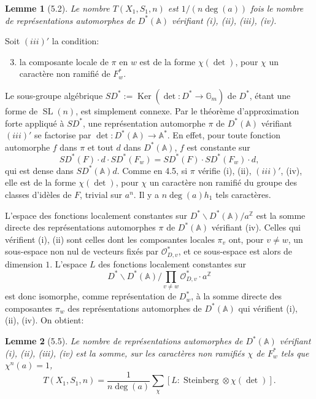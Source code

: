 \documentclass[10pt]{article}
\newcommand{\Z}{\mathbb Z}
\newcommand{\Adele}{\mathbb A}
\newcommand{\Gm}{\mathbb G_m}
\newcommand{\SL}{\operatorname{SL}}
\newcommand{\degm}{\operatorname{deg}}
\theoremstyle{deligne}
\newtheorem*{lemma*}{Lemme}
\newcommand{\Stein}{\operatorname{Steinberg}}
\newcommand{\Ker}{\operatorname{Ker}}
\newcommand{\heading}[1]{\vspace{0.7em}\noindent{\bfseries #1}\quad}
\begin{document}
\begin{lemma*}[5.2]
Le nombre $T(X_1,S_1,n)$ est $1/(n\degm(a))$ fois le nombre de représentations automorphes de $D^*(\Adele)$ vérifiant (i), (ii), (iii), (iv).
\end{lemma*}

\heading{5.3.} Soit $(iii)'$ la condition:
\begin{enumerate}[label=(\roman*)$'$]
\setcounter{enumi}{2}
\item la composante locale de $\pi$ en $w$ est de la forme $\chi(\det)$, pour $\chi$ un caractère non ramifié de $F_w^*$.
\end{enumerate}
Le sous-groupe algébrique $SD^*:=\Ker(\det:D^*\to\Gm)$ de $D^*$, étant une forme de $\SL(n)$, est simplement connexe. Par le théorème d'approximation forte appliqué à $SD^*$, une représentation automorphe $\pi$ de $D^*(\Adele)$ vérifiant $(iii)'$ se factorise par $\det:D^*(\Adele)\to\Adele^*$. En effet, pour toute fonction automorphe $f$ dans $\pi$ et tout $d$ dans $D^*(\Adele)$, $f$ est constante sur
\[
SD^*(F)\cdot d\cdot SD^*(F_w)=SD^*(F)\cdot SD^*(F_w)\cdot d,
\]
qui est dense dans $SD^*(\Adele)d$. Comme en 4.5, si $\pi$ vérifie (i), (ii), $(iii)'$, (iv), elle est de la forme $\chi(\det)$, pour $\chi$ un caractère non ramifié du groupe des classes d'id\`eles de $F$, trivial sur $a^n$. Il y a $n\degm(a)h_1$ tels caractères.

\heading{5.4.} L'espace des fonctions localement constantes sur $D^*\backslash D^*(\Adele)/a^\Z$ est la somme directe des représentations automorphes $\pi$ de $D^*(\Adele)$ vérifiant (iv). Celles qui vérifient (i), (ii) sont celles dont les composantes locales $\pi_v$ ont, pour $v\ne w$, un sous-espace non nul de vecteurs fixés par $\mathcal O_{D,v}^*$, et ce sous-espace est alors de dimension $1$. L'espace $L$ des fonctions localement constantes sur
\[
D^*\backslash D^*(\Adele)/\prod_{v\ne w}\mathcal O_{D,v}^*\cdot a^\Z
\]
est donc isomorphe, comme représentation de $D_w^*$, à la somme directe des composantes $\pi_w$ des représentations automorphes de $D^*(\Adele)$ qui vérifient (i), (ii), (iv). On obtient:

\begin{lemma*}[5.5]
Le nombre de représentations automorphes de $D^*(\Adele)$ vérifiant (i), (ii), (iii), (iv) est la somme, sur les caractères non ramifiés $\chi$ de $F_w^*$ tels que $\chi^n(a)=1$,
\begin{equation}\tag{5.5.1}
T(X_1,S_1,n)=\frac{1}{n\degm(a)}\sum_\chi [L:\Stein\otimes\chi(\det)].
\end{equation}
\end{lemma*}
\end{document}
